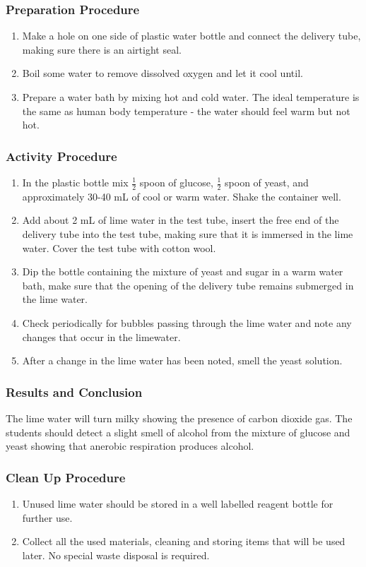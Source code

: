 \subsubsection*{Preparation Procedure}
\begin{enumerate}
\item{Make a hole on one side of plastic water bottle and connect the delivery tube, making sure there is an airtight seal.}
\item{Boil some water to remove dissolved oxygen and let it cool until.}
\item{Prepare a water bath by mixing hot and cold water. The ideal temperature is the same as human body temperature - the water should feel warm but not hot.}
\end{enumerate}

\subsubsection*{Activity Procedure}
\begin{enumerate}
\item{In the plastic bottle mix $\frac{1}{2}$ spoon of glucose, $\frac{1}{2}$ spoon of yeast, and approximately 30-40 mL of cool or warm water. Shake the container well.}
\item{Add about 2 mL of lime water in the test tube, insert the free end of the delivery tube into the test tube, making sure that it is immersed in the lime water. Cover the test tube with cotton wool.}
\item{Dip the bottle containing the mixture of yeast and sugar in a warm water bath, make sure that the opening of the delivery tube remains submerged in the lime water.}
\item{Check periodically for bubbles passing through the lime water and note any changes that occur in the limewater.}
\item{After a change in the lime water has been noted, smell the yeast solution.}
\end{enumerate}

\subsubsection*{Results and Conclusion}
The lime water will turn milky showing the presence of carbon dioxide gas.
The students should detect a slight smell of alcohol from the mixture of glucose and yeast showing that anerobic respiration produces alcohol.

\subsubsection*{Clean Up Procedure}
\begin{enumerate}
\item{Unused lime water should be stored in a well labelled reagent bottle for further use.}
\item{Collect all the used materials, cleaning and storing items that will be used later. No special waste disposal is required.}
\end{enumerate}

